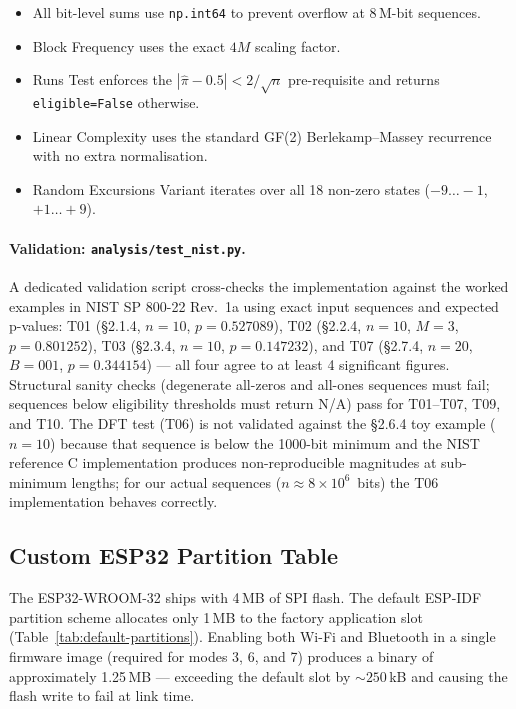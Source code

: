 \documentclass[10pt,twocolumn]{article}
\begin{document}
\begin{itemize}[noitemsep]
  \item All bit-level sums use \texttt{np.int64} to prevent overflow at
        8\,M-bit sequences.
  \item Block Frequency uses the exact $4M$ scaling factor.
  \item Runs Test enforces the $|\hat\pi-0.5| < 2/\sqrt{n}$
        pre-requisite and returns \texttt{eligible=False} otherwise.
  \item Linear Complexity uses the standard GF(2) Berlekamp--Massey
        recurrence with no extra normalisation.
  \item Random Excursions Variant iterates over all 18 non-zero states
        ($-9\ldots-1$, $+1\ldots+9$).
\end{itemize}

\paragraph{Validation: \texttt{analysis/test\_nist.py}.}
A dedicated validation script cross-checks the implementation against
the worked examples in NIST SP 800-22 Rev.~1a using exact input
sequences and expected p-values:
T01 (\S2.1.4, $n=10$, $p=0.527089$),
T02 (\S2.2.4, $n=10$, $M=3$, $p=0.801252$),
T03 (\S2.3.4, $n=10$, $p=0.147232$), and
T07 (\S2.7.4, $n=20$, $B=001$, $p=0.344154$) ---
all four agree to at least 4 significant figures.
Structural sanity checks (degenerate all-zeros and all-ones sequences
must fail; sequences below eligibility thresholds must return N/A) pass
for T01--T07, T09, and T10.
The DFT test (T06) is not validated against the \S2.6.4 toy example
($n=10$) because that sequence is below the 1000-bit minimum and the
NIST reference C implementation produces non-reproducible magnitudes at
sub-minimum lengths; for our actual sequences ($n \approx 8 \times
10^6$~bits) the T06 implementation behaves correctly.

\subsection{Custom ESP32 Partition Table}
\label{sec:partition}

The ESP32-WROOM-32 ships with 4\,MB of SPI flash.
The default ESP-IDF partition scheme allocates only 1\,MB to the factory
application slot (Table~\ref{tab:default-partitions}).
Enabling both Wi-Fi and Bluetooth in a single firmware image (required
for modes 3, 6, and 7) produces a binary of approximately 1.25\,MB ---
exceeding the default slot by $\sim\!250$\,kB and causing the flash
write to fail at link time.
\end{document}
